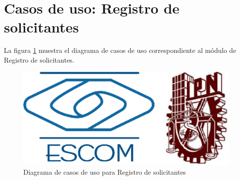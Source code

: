 
\pagebreak
\section{Casos de uso: Registro de solicitantes}

	La figura \ref{CUs:RegistroAspirantes} muestra el diagrama de casos de uso correspondiente al módulo de Registro de solicitantes.

	\begin{figure}[h]

		\begin{center}

			\includegraphics[scale=0.35]{imagenes/CUs/RegistroSolicitantes/CUs-RegistroSolicitantes.jpg}
			\caption{Diagrama de casos de uso para Registro de solicitantes }
			\label{CUs:RegistroAspirantes}

		\end{center}
		
	\end{figure}